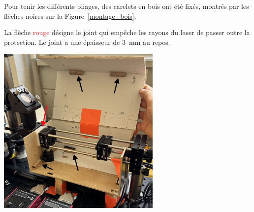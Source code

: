 \begin{minipage}{\textwidth}
    Pour tenir les différents pliages, des carelets en bois ont été fixés, montrés par les flèches noires sur la Figure~\ref{montage_bois}.

    La flèche \textcolor{red}{rouge} désigne le joint qui empêche les rayons du laser de passer outre la protection. Le joint a une épaisseur de 3~mm au repos.
    \vspace{1em}
    \begin{center}
        \includegraphics[width=0.6\textwidth]{assets/figures/Protections_laser/Securite_mecanique/Protection_entree_laser/montage_bois.jpeg}
    \end{center}
    \label{montage_bois}
\end{minipage}
